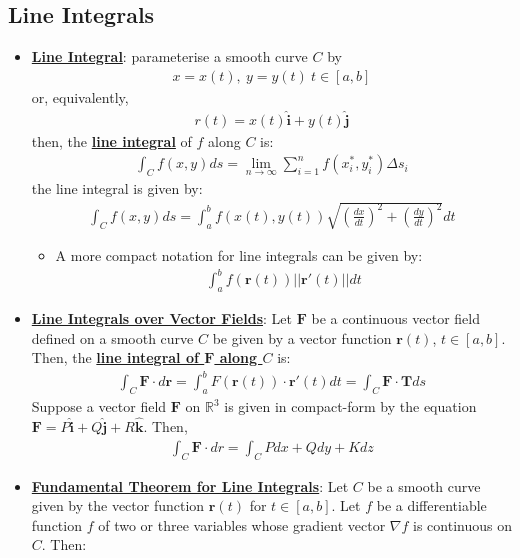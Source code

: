 \documentclass[11pt]{article}
\newcommand{\dfn}[1]{\underline{\textbf{#1}}}
\newcommand{\R}[0]{\mathbb{R}}
\begin{document}
\subsection{Line Integrals}
\begin{itemize}[noitemsep]
	\item \dfn{Line Integral}: parameterise a smooth curve $C$ by
	\begin{align*}
		x = x(t),\ y = y(t)\ t \in [a,b] 
	\end{align*}
	or, equivalently, 
	\begin{align*}
		r(t) = x(t) \hat{\textbf{i}} + y(t) \hat{\textbf{j}} 
	\end{align*}
	then, the \dfn{line integral} of $f$ along $C$ is: 
	\begin{align}
		\int_C f(x,y) ds = \lim_{n \rightarrow \infty} \sum_{i=1}^n f(x_i^*, y_i^*) \Delta s_i 	
	\end{align}
	the line integral is given by: 
	\begin{align}
		\int_C f(x,y) ds = \int_a^b f(x(t), y(t)) \sqrt{\left( \frac{dx}{dt} \right)^2 + \left( \frac{dy}{dt} \right)^2 } dt 	
	\end{align}
	\begin{itemize}[noitemsep]
		\item A more compact notation for line integrals can be given by: 
		\begin{align}
			\int_a^b f(\mathbf{r}(t)) || \mathbf{r}'(t) || dt 	
		\end{align}
	\end{itemize}
	\item \dfn{Line Integrals over Vector Fields}: Let $\mathbf{F}$ be a continuous vector field defined on a smooth curve $C$ be given by a vector function $\mathbf{r}(t)$, $ t \in [a,b]$. Then, the \dfn{line integral of $\mathbf{F}$ along $C$} is: 
	\begin{align}
		\int_C \mathbf{F} \cdot d \mathbf{r} = \int_a^b F(\mathbf{r}(t)) \cdot \mathbf{r}'(t) dt = \int_C \mathbf{F} \cdot \mathbf{T} ds 	
	\end{align}
	Suppose a vector field $\mathbf{F}$ on $\R^3$ is given in compact-form by the equation $\mathbf{F} = P \hat{\mathbf{i}} + Q \hat{\mathbf{j}} + R \hat{\mathbf{k}} $. Then, 
	\begin{align}
		\int_C \mathbf{F} \cdot dr = \int_C P dx + Q dy + K dz 	
	\end{align}
	\item \dfn{Fundamental Theorem for Line Integrals}: Let $C$ be a smooth curve given by the vector function $\mathbf{r}(t)$ for $t \in [a,b]$. Let $f$ be a differentiable function $f$ of two or three variables whose gradient vector $\nabla f$ is continuous on $C$. Then:

\end{itemize}
\end{document}
